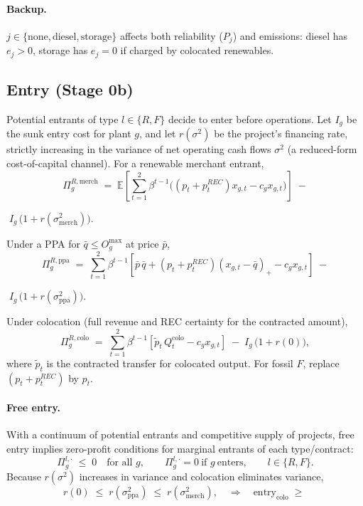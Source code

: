 \documentclass[a4paper,fleqn,longmktitle]{cas-sc}
\begin{document}
\paragraph{Backup.} $j\in\{\text{none},\text{diesel},\text{storage}\}$ affects both reliability ($P_j$) and emissions: diesel has $e_j>0$, storage has $e_j=0$ if charged by colocated renewables.

\subsection{Entry (Stage 0b)}

Potential entrants of type $l\in\{R,F\}$ decide to enter before operations. Let $I_g$ be the sunk entry cost for plant $g$, and let $r(\sigma^2)$ be the project’s financing rate, strictly increasing in the variance of net operating cash flows $\sigma^2$ (a reduced-form cost-of-capital channel). For a renewable merchant entrant,
\begin{equation}
\label{eq:profit_merchant}
\Pi^{R,\text{merch}}_g \;=\; \mathbb{E}\!\left[\sum_{t=1}^{2}\beta^{t-1}\big((p_t+p^{REC}_t) x_{g,t}-c_g x_{g,t}\big) \right]
\;-
\end{equation}
\begin{center}
    $\; I_g\,\Big(1+r(\sigma^2_{\text{merch}})\Big).$
\end{center}
Under a PPA for $\bar q\le O^{\max}_g$ at price $\bar p$,
\begin{equation}
\label{eq:profit_ppa}
\Pi^{R,\text{ppa}}_g \;=\; \sum_{t=1}^{2}\beta^{t-1}\left[\bar p\,\bar q + (p_t+p^{REC}_t)(x_{g,t}-\bar q)_+ - c_g x_{g,t}\right]
\;-
\end{equation}
\begin{center}
    $\; I_g\,\Big(1+r(\sigma^2_{\text{ppa}})\Big).$
\end{center}
Under colocation (full revenue and REC certainty for the contracted amount),
\begin{equation}
\label{eq:profit_colo}
\Pi^{R,\text{colo}}_g \;=\; \sum_{t=1}^{2}\beta^{t-1}\left[\tilde p_t\, Q^{\text{colo}}_t - c_g x_{g,t}\right]
\;-\; I_g\,\Big(1+r(0)\Big),
\end{equation}
where $\tilde p_t$ is the contracted transfer for colocated output. For fossil $F$, replace $(p_t+p^{REC}_t)$ by $p_t$.

\paragraph{Free entry.} With a continuum of potential entrants and competitive supply of projects, free entry implies zero-profit conditions for marginal entrants of each type/contract:
\begin{equation}
\Pi^{l,\cdot}_g \;\le\; 0\quad\text{for all }g,\qquad
\Pi^{l,\cdot}_g=0\ \text{if }g\ \text{enters},\qquad l\in\{R,F\}.
\end{equation}
Because $r(\sigma^2)$ increases in variance and colocation eliminates variance,
\begin{equation}
r(0)\;\le\; r(\sigma^2_{\text{ppa}})\;\le\; r(\sigma^2_{\text{merch}}),
\quad\Rightarrow\quad
\text{entry}_{\text{colo}} \;\ge\;
\end{equation}
\end{document}
